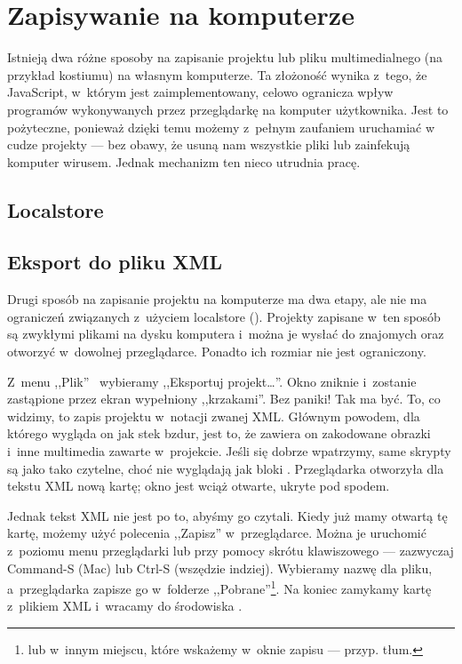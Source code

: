 \documentclass[a4paper]{report}
\begin{document}
\section{Zapisywanie na komputerze}

Istnieją dwa różne sposoby na zapisanie projektu lub pliku multimedialnego (na przykład kostiumu) na własnym komputerze. Ta złożoność wynika z~tego, że JavaScript, w~którym \Snap{} jest zaimplementowany, celowo ogranicza wpływ programów wykonywanych przez przeglądarkę na komputer użytkownika. Jest to pożyteczne, ponieważ dzięki temu możemy z~pełnym zaufaniem uruchamiać w~ cudze projekty --- bez obawy, że usuną nam wszystkie pliki lub zainfekują komputer wirusem. Jednak mechanizm ten nieco utrudnia pracę.

\subsection{Localstore}

{\Huge \TODO{}}

\subsection{Eksport do pliku XML}
\label{subsec:eksport-do-pliku-xml}

Drugi sposób na zapisanie projektu na komputerze ma dwa etapy, ale nie ma ograniczeń związanych z~użyciem localstore (). Projekty zapisane w~ten sposób są zwykłymi plikami na dysku komputera i~można je wysłać do znajomych oraz otworzyć w~dowolnej przeglądarce. Ponadto ich rozmiar nie jest ograniczony.

Z~menu ,,Plik''~ wybieramy ,,Eksportuj projekt\ldots''. Okno  zniknie i~zostanie zastąpione przez ekran wypełniony ,,krzakami''. Bez paniki! Tak ma być. To, co widzimy, to zapis projektu w~notacji zwanej XML. Głównym powodem, dla którego wygląda on jak stek bzdur, jest to, że zawiera on zakodowane obrazki i~inne multimedia zawarte w~projekcie. Jeśli się dobrze wpatrzymy, same skrypty są jako tako czytelne, choć nie wyglądają jak bloki . Przeglądarka otworzyła dla tekstu XML nową kartę; okno  jest wciąż otwarte, ukryte pod spodem.

Jednak tekst XML nie jest po to, abyśmy go czytali. Kiedy już mamy otwartą tę kartę, możemy użyć polecenia ,,Zapisz'' w~przeglądarce. Można je uruchomić z~poziomu menu przeglądarki lub przy pomocy skrótu klawiszowego --- zazwyczaj Command-S (Mac) lub Ctrl-S (wszędzie indziej). Wybieramy nazwę dla pliku, a~przeglądarka zapisze go w~folderze ,,Pobrane''\footnote{lub w~innym miejscu, które wskażemy w~oknie zapisu --- przyp. tłum.}. Na koniec zamykamy kartę z~plikiem XML i~wracamy do środowiska \Snap{}.
\end{document}
